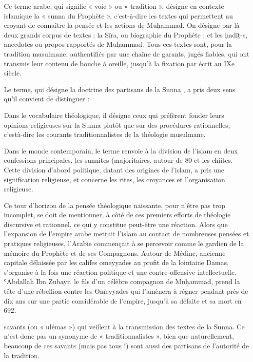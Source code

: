 \begin{Def}[Sunna]
Ce terme arabe, qui signifie « voie » ou « tradition », désigne en contexte
islamique la « sunna du Prophète », c’est-à-dire les textes qui permettent au croyant de
connaître la pensée et les actions de Muḥammad. On désigne par là deux grands corpus de
textes : la Sīra, ou biographie du Prophète ; et les ḥadīṯ-s, anecdotes ou propos rapportés de
Muḥammad. Tous ces textes sont, pour la tradition musulmane, authentifiés par une chaîne
de garants, jugés fiables, qui ont transmis leur contenu de bouche à oreille, jusqu’à la fixation
par écrit au IXe
siècle.
\end{Def}

\begin{Def}[sunnisme]
Le terme, qui désigne la doctrine des partisans de la Sunna , a pris deux sens qu’il convient de distinguer :
\bi
\item Dans le vocabulaire théologique, il désigne ceux qui préfèrent fonder leurs
opinions religieuses sur la Sunna plutôt que sur des procédures rationnelles, c’està-dire les courants traditionnalistes de la théologie musulmane.
\item Dans le monde contemporain, le terme renvoie à la division de l’islam en deux
confessions principales, les sunnites (majoritaires, autour de 80 %
et les chiites. Cette division d’abord politique, datant des origines de l’islam, a pris
une signification religieuse, et concerne les rites, les croyances et l’organisation
religieuse.
\ei
\end{Def}


Ce tour d'horizon de la pensée théologique naissante, pour n'être pas
trop incomplet, se doit de mentionner, à côté de ces premiers efforts de
théologie discursive et rationnel, ce qui y constitue peut-être une
réaction. Alors que l'expansion de l'empire arabe mettait l'islam au
contact de nombreuses pensées et pratiques religieuses, l'Arabie
commençait à se percevoir comme le gardien de la mémoire du Prophète et
de ses Compagnons. Autour de Médine, ancienne capitale délaissée par les
califes omeyyades au profit de la lointaine Damas, s'organise à la fois
une réaction politique et une contre-offensive intellectuelle. ʿAbdallah
Ibn Zubayr, le fils d'un célèbre compagnon de Muḥammad, prend la tête
d'une rébellion contre les Omeyyades qui l'amènera à régner pendant près
de dix ans sur une partie considérable de l'empire, jusqu'à sa défaite
et sa mort en 692.

\begin{Def}[Traditionnistes]
 savants (ou « ulémas ») qui veillent à la
transmission des textes de la Sunna. Ce n’est donc pas un synonyme de « traditionnalistes », 
bien que naturellement, beaucoup de ces savants (mais pas tous !) sont aussi des partisans de
l’autorité de la tradition. 
\end{Def}

